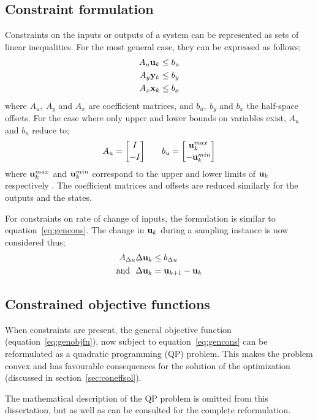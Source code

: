 \subsection{Constraint formulation}
Constraints on the inputs or outputs of a system can be represented as sets of linear inequalities.
For the most general case, they can be expressed as follows;
\begin{align}
  \label{eq:gencons}
  A_u{\bf {u}}_k &\leq b_u \notag \\
  A_y{\bf {y}}_k &\leq b_y \\
  A_x{\bf {x}}_k &\leq b_x \notag
\end{align}
where $A_u,~A_y$ and $A_x$ are coefficient matrices, and $b_u,~b_y$ and $b_x$ the half-space offsets.
For the case where only upper and lower bounds on variables exist, $A_u$ and $b_u$ reduce to;
\begin{align*}
  A_u={I\brack -I} \qquad b_u={{\bf {u}}^{max}_k \brack -{\bf {u}}^{min}_k}
\end{align*}
where ${\bf {u}}^{max}_k$ and ${\bf {u}}^{min}_k$ correspond to the upper and lower limits of ${\bf {u}}_k$ respectively \citep[6]{rawlings}. 
The coefficient matrices and offsets are reduced similarly for the outputs and the states.

For constraints on rate of change of inputs, the formulation is similar to equation~\ref{eq:gencons}.
The change in ${\bf {u}}_k$ during a sampling instance is now considered thus;
\begin{align*}
  A_{\Delta u}\Delta {\bf {u}}_k &\leq b_{\Delta u} \notag \\
  \text{and}~~ \Delta {\bf {u}}_k &= {\bf {u}}_{k+1}-{\bf {u}}_k
\end{align*}

\subsection{Constrained objective functions}\label{sec:conobjfn}
When constraints are present, the general objective function (equation~\ref{eq:genobjfn}), now subject to equation~\ref{eq:gencons} can be reformulated as a quadratic programming (QP) problem.
This makes the problem convex and has favourable consequences for the solution of the optimization (discussed in section~\ref{sec:coneffsol}).

The mathematical description of the QP problem is omitted from this dissertation, but \citet[81-83]{maciejowskimpc} as well as \citet[489-490]{rawlings} can be consulted for the complete reformulation.

